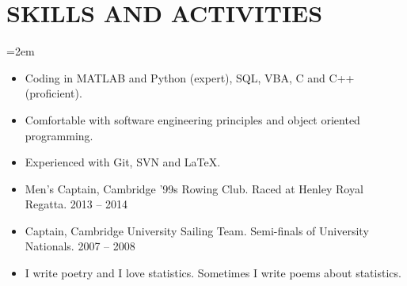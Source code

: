 \documentclass[letterpaper,10pt]{article}
\newcommand{\NewPart}[1]{\vspace{-1em} \section*{\uppercase{#1}}}
\newcommand{\Details}[1]{\hangindent=2em\hangafter=0\small#1\normalsize\par}
\begin{document}
\NewPart{Skills and Activities}

\Details{
\begin{itemize}
 \item Coding in MATLAB and Python (expert), SQL, VBA, C and C++ (proficient).
 \item Comfortable with software engineering principles and object oriented programming.
 \item Experienced with Git, SVN and LaTeX.
 \item Men's Captain, Cambridge '99s Rowing Club. Raced at Henley Royal Regatta. 2013 -- 2014
 \item Captain, Cambridge University Sailing Team. Semi-finals of University Nationals. 2007 -- 2008
 \item I write poetry and I love statistics. Sometimes I write poems about statistics.
\end{itemize}
}
\end{document}
